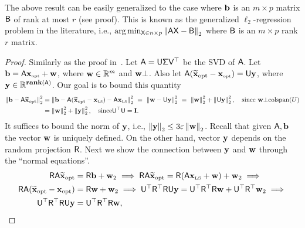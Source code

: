 \begin{remark}
The above result can be easily generalized to the case where $\b$ is an $m\times p$ matrix $\matB$ of rank at most $r$ (see proof). This is known as the generalized $\ell_2$-regression problem in the literature, i.e., $\arg\min_{\matX\in{n\times p}}\norm{\matA\matX-\matB}$ where $\matB$ is an $m\times p$ rank $r$ matrix.
\end{remark}
\begin{proof}
Similarly as the proof in~\cite{sarlos}. Let $\matA=\matU\matSig \matV^\top$ be the SVD of $\matA$. Let  $\b=\matA \xopt + \w$, where $\w\in\RR^m$ and $\w\bot$. Also let $\matA(\widetilde{\x}_{\text{opt}} - \xopt)=\matU\y$, where $\y \in \RR^{\rank{\matA}}$. Our goal is to bound this quantity
\begin{align}
 \norm{\b-\matA\widetilde{\x}_{\text{opt}}}^2 &= \norm{\b-\matA(\widetilde{\x}_{\text{opt}} - \xls) - \matA\xls }^2\nonumber
                            \ =\  \norm{\w - \matU\y}^2 \nonumber
			    \ = \ \norm{\w}^2 +\norm{\matU\y}^2,  \quad \text{since }\w\bot \text{colspan}(U)\nonumber  \\
				& =  \norm{\w}^2 + \norm{\y}^2, \quad \text{since} \matU^\top \matU = \Id. \label{eq:l2_basic}
\end{align}
It suffices to bound the norm of $\y$, i.e., $\norm{\y} \leq 3\eps \norm{\w}$. Recall that given $\matA,\b$ the vector $\w$ is uniquely defined. On the other hand, vector $\y$ depends on the random projection $\matR$. Next we show the connection between $\y$ and $\w$ through the ``normal equations''.
\begin{align}
	\matR\matA\widetilde{\x}_{\text{opt}}  &= \matR\b +\w_2 \implies \nonumber
	\matR\matA\widetilde{\x}_{\text{opt}}   = \matR(\matA\xls + \w) + \w_2 \implies \nonumber \\
	\matR\matA(\widetilde{\x}_{\text{opt}} - \x_{\text{opt}})  &= \matR\w + \w_2 \implies \nonumber
	\matU^\top \matR^\top \matR \matU \y  = \matU^\top \matR^\top \matR\w  + \matU^\top  \matR^\top  \w_2 \implies
\nonumber \\
	\matU^\top \matR^\top \matR \matU \y  &= \matU^\top \matR^\top \matR\w \label{eq:random_l2},
\end{align}

\end{proof}
